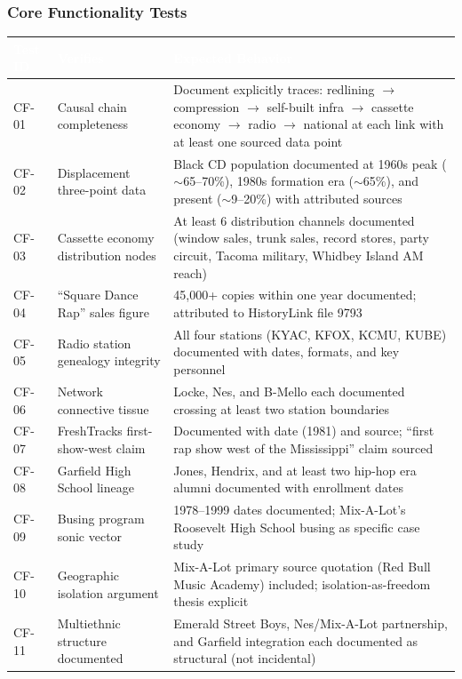 \documentclass[11pt,letterpaper]{article}
\newcommand{\tableheader}[1]{\textbf{\sffamily\textcolor{white}{#1}}}
\begin{document}
\subsubsection{Core Functionality Tests}

\begin{center}
\begin{tabularx}{\textwidth}{C{1.5cm}L{3cm}X}
\toprule
{}
\tableheader{Test ID} & \tableheader{Verifies} & \tableheader{Expected Behavior} \\
\midrule
CF-01 & Causal chain completeness & Document explicitly traces: redlining $\rightarrow$ compression $\rightarrow$ self-built infra $\rightarrow$ cassette economy $\rightarrow$ radio $\rightarrow$ national at each link with at least one sourced data point \\
CF-02 & Displacement three-point data & Black CD population documented at 1960s peak ($\sim$65--70\%), 1980s formation era ($\sim$65\%), and present ($\sim$9--20\%) with attributed sources \\
CF-03 & Cassette economy distribution nodes & At least 6 distribution channels documented (window sales, trunk sales, record stores, party circuit, Tacoma military, Whidbey Island AM reach) \\
CF-04 & ``Square Dance Rap'' sales figure & 45,000+ copies within one year documented; attributed to HistoryLink file 9793 \\
CF-05 & Radio station genealogy integrity & All four stations (KYAC, KFOX, KCMU, KUBE) documented with dates, formats, and key personnel \\
CF-06 & Network connective tissue & Locke, Nes, and B-Mello each documented crossing at least two station boundaries \\
CF-07 & FreshTracks first-show-west claim & Documented with date (1981) and source; ``first rap show west of the Mississippi'' claim sourced \\
CF-08 & Garfield High School lineage & Jones, Hendrix, and at least two hip-hop era alumni documented with enrollment dates \\
CF-09 & Busing program sonic vector & 1978--1999 dates documented; Mix-A-Lot's Roosevelt High School busing as specific case study \\
CF-10 & Geographic isolation argument & Mix-A-Lot primary source quotation (Red Bull Music Academy) included; isolation-as-freedom thesis explicit \\
CF-11 & Multiethnic structure documented & Emerald Street Boys, Nes/Mix-A-Lot partnership, and Garfield integration each documented as structural (not incidental) \\

\end{tabularx}
\end{center}
\end{document}
